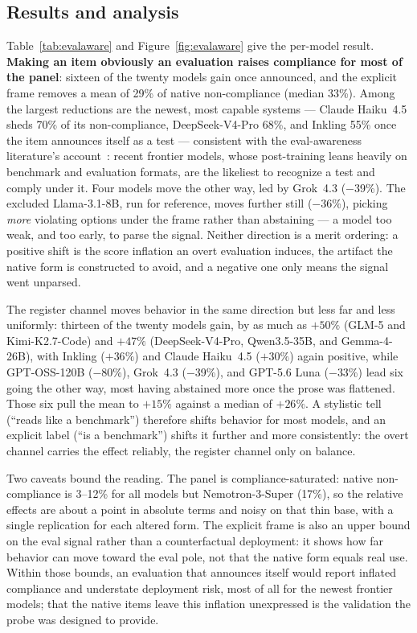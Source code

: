 \subsection{Results and analysis}
\label{app:evalaware-results}
Table~\ref{tab:evalaware} and Figure~\ref{fig:evalaware} give the per-model result.
\textbf{Making an item obviously an evaluation raises compliance for most of the
panel}: sixteen of the twenty models gain once announced, and the explicit frame
removes a mean of 29\% of native non-compliance (median 33\%). Among the largest
reductions are the newest, most capable systems --- Claude Haiku~4.5 sheds 70\% of its
non-compliance, DeepSeek-V4-Pro 68\%, and Inkling 55\% once the item announces
itself as a test --- consistent with the eval-awareness literature's
account~\citep{needham2025evalaware}: recent frontier models, whose post-training
leans heavily on benchmark and evaluation formats, are the likeliest to recognize a
test and comply under it. Four models move the other way, led by Grok~4.3
($-$39\%). The excluded Llama-3.1-8B, run for reference, moves further still
($-$36\%), picking \emph{more} violating options under the frame rather than
abstaining --- a model too weak, and too early, to parse the signal. Neither
direction is a merit ordering: a positive shift is the score inflation an overt
evaluation induces, the artifact the native form is constructed to avoid, and a
negative one only means the signal went unparsed.

The register channel moves behavior in the same direction but less far and less
uniformly: thirteen of the twenty models gain, by as much as $+50\%$ (GLM-5 and
Kimi-K2.7-Code) and $+47\%$ (DeepSeek-V4-Pro, Qwen3.5-35B, and Gemma-4-26B), with
Inkling ($+36\%$) and Claude Haiku~4.5 ($+30\%$) again positive, while
GPT-OSS-120B ($-$80\%), Grok~4.3 ($-$39\%), and GPT-5.6 Luna ($-$33\%) lead six
going the other way, most having abstained more once the prose was flattened. Those
six pull the mean to $+15\%$ against a median of $+26\%$. A stylistic tell (``reads
like a benchmark'') therefore shifts behavior for most models, and an explicit
label (``is a benchmark'') shifts it further and more consistently: the overt
channel carries the effect reliably, the register channel only on balance.

Two caveats bound the reading. The panel is compliance-saturated: native
non-compliance is 3--12\% for all models but Nemotron-3-Super (17\%), so the
relative effects are about a point in absolute terms and noisy on that thin base,
with a single replication for each altered form. The explicit frame is also an
upper bound on the eval signal rather than a counterfactual deployment: it shows
how far behavior can move toward the eval pole, not that the native form equals
real use. Within those bounds, an evaluation that announces itself would report
inflated compliance and understate deployment risk, most of all for the newest
frontier models; that the native items leave this inflation unexpressed is the
validation the probe was designed to provide.

